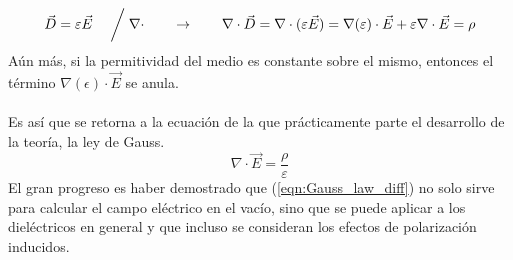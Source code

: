\documentclass[12pt, oneside, numbers, spanish]{ezthesis}
\numberwithin{equation}{section}
\begin{document}
\begin{equation}
\vec{D} = \varepsilon\vec{E}\quad\biggm/\nabla\cdot\qquad\rightarrow\qquad\nabla\cdot\vec{D}=\nabla\cdot(\varepsilon\vec{E}) = \nabla(\varepsilon)\cdot\vec{E} + \varepsilon\nabla\cdot\vec{E} = \rho
\end{equation}
Aún más, si la permitividad del medio es constante sobre el mismo, entonces el término $\nabla (\epsilon)\cdot\vec{E}$ se anula.\\\\
Es así que se retorna a la ecuación de la que prácticamente parte el desarrollo de la teoría, la ley de Gauss.
\begin{equation}
\nabla\cdot\vec{E} = \frac{\rho}{\varepsilon}
\end{equation}
El gran progreso es haber demostrado que (\ref{eqn:Gauss_law_diff}) no solo sirve para calcular el campo eléctrico en el vacío, sino que se puede aplicar a los dieléctricos en general y que incluso se consideran los efectos de polarización inducidos.
\end{document}
